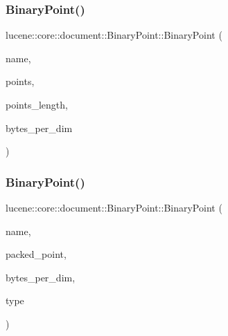 \subsubsection{\texorpdfstring{Binary\+Point()}{BinaryPoint()}\hspace{0.1cm}{\footnotesize\ttfamily [1/2]}}
{\footnotesize\ttfamily lucene\+::core\+::document\+::\+Binary\+Point\+::\+Binary\+Point (\begin{DoxyParamCaption}\item[{\mbox{\hyperlink{ZlibCrc32_8h_a2c212835823e3c54a8ab6d95c652660e}{const}} std\+::string \&}]{name,  }\item[{\mbox{\hyperlink{ZlibCrc32_8h_a2c212835823e3c54a8ab6d95c652660e}{const}} char $\ast$}]{points,  }\item[{\mbox{\hyperlink{ZlibCrc32_8h_a2c212835823e3c54a8ab6d95c652660e}{const}} uint32\+\_\+t}]{points\+\_\+length,  }\item[{\mbox{\hyperlink{ZlibCrc32_8h_a2c212835823e3c54a8ab6d95c652660e}{const}} uint32\+\_\+t}]{bytes\+\_\+per\+\_\+dim }\end{DoxyParamCaption})\hspace{0.3cm}{\ttfamily [inline]}}

\mbox{\label{classlucene_1_1core_1_1document_1_1BinaryPoint_a8eea62d212ffd7385f3e6a6f0ca6c482}} 
\subsubsection{\texorpdfstring{Binary\+Point()}{BinaryPoint()}\hspace{0.1cm}{\footnotesize\ttfamily [2/2]}}
{\footnotesize\ttfamily lucene\+::core\+::document\+::\+Binary\+Point\+::\+Binary\+Point (\begin{DoxyParamCaption}\item[{\mbox{\hyperlink{ZlibCrc32_8h_a2c212835823e3c54a8ab6d95c652660e}{const}} std\+::string \&}]{name,  }\item[{\mbox{\hyperlink{ZlibCrc32_8h_a2c212835823e3c54a8ab6d95c652660e}{const}} char $\ast$}]{packed\+\_\+point,  }\item[{\mbox{\hyperlink{ZlibCrc32_8h_a2c212835823e3c54a8ab6d95c652660e}{const}} uint32\+\_\+t}]{bytes\+\_\+per\+\_\+dim,  }\item[{\mbox{\hyperlink{ZlibCrc32_8h_a2c212835823e3c54a8ab6d95c652660e}{const}} \mbox{\hyperlink{classlucene_1_1core_1_1document_1_1FieldType}{Field\+Type}} \&}]{type }\end{DoxyParamCaption})\hspace{0.3cm}{\ttfamily [inline]}}

